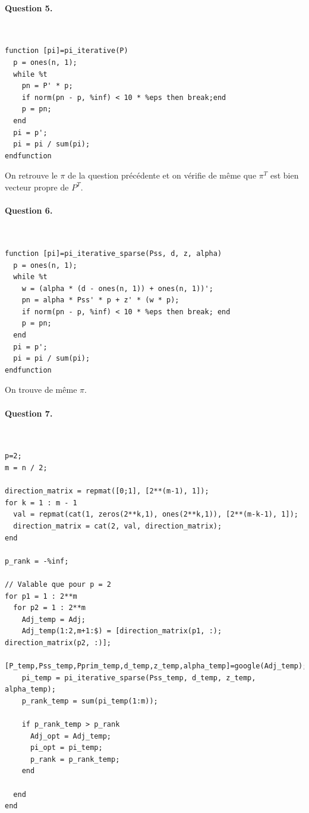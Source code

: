 \documentclass[12pt,a4paper]{article}
\begin{document}
\paragraph*{Question 5.}
~
\begin{lstlisting}
function [pi]=pi_iterative(P)
  p = ones(n, 1);
  while %t
    pn = P' * p;
    if norm(pn - p, %inf) < 10 * %eps then break;end
    p = pn;
  end
  pi = p';
  pi = pi / sum(pi);
endfunction
\end{lstlisting}

On retrouve le $\pi$ de la question précédente et on vérifie de même que $\pi^T$ est bien vecteur propre de $P^T$.

\paragraph*{Question 6.}
~
\begin{lstlisting}
function [pi]=pi_iterative_sparse(Pss, d, z, alpha)
  p = ones(n, 1);
  while %t
    w = (alpha * (d - ones(n, 1)) + ones(n, 1))';
    pn = alpha * Pss' * p + z' * (w * p);
    if norm(pn - p, %inf) < 10 * %eps then break; end
    p = pn;
  end
  pi = p';
  pi = pi / sum(pi);
endfunction
\end{lstlisting}

On trouve de même $\pi$.

\paragraph*{Question 7.}
~
\begin{lstlisting}
p=2;
m = n / 2;

direction_matrix = repmat([0;1], [2**(m-1), 1]);
for k = 1 : m - 1
  val = repmat(cat(1, zeros(2**k,1), ones(2**k,1)), [2**(m-k-1), 1]);
  direction_matrix = cat(2, val, direction_matrix);
end

p_rank = -%inf;

// Valable que pour p = 2
for p1 = 1 : 2**m
  for p2 = 1 : 2**m
    Adj_temp = Adj;
    Adj_temp(1:2,m+1:$) = [direction_matrix(p1, :); direction_matrix(p2, :)];
    [P_temp,Pss_temp,Pprim_temp,d_temp,z_temp,alpha_temp]=google(Adj_temp);
    pi_temp = pi_iterative_sparse(Pss_temp, d_temp, z_temp, alpha_temp);
    p_rank_temp = sum(pi_temp(1:m));
    
    if p_rank_temp > p_rank
      Adj_opt = Adj_temp;
      pi_opt = pi_temp;
      p_rank = p_rank_temp;
    end

  end
end
\end{lstlisting}
\end{document}
